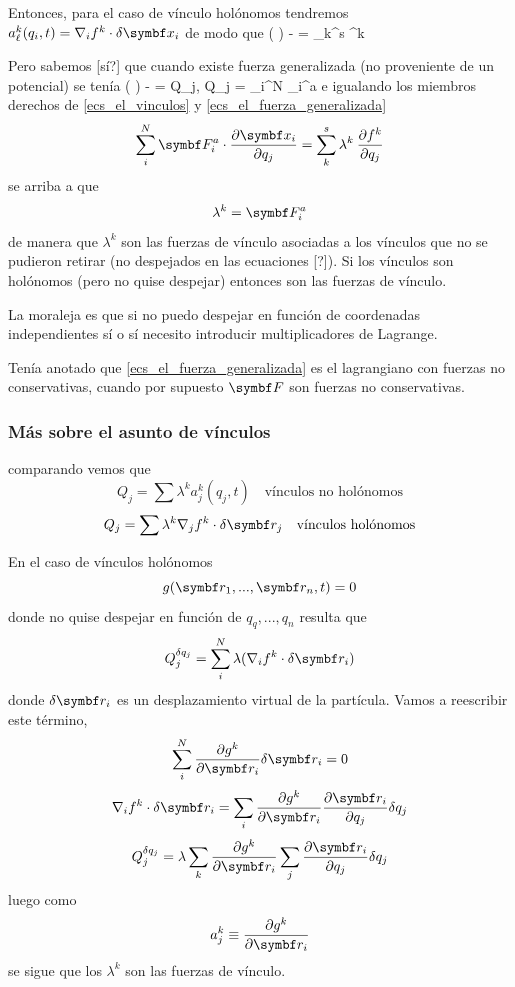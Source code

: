\documentclass[10pt,oneside]{CBFT_book}
\begin{document}
Entonces, para el caso de vínculo holónomos tendremos $ a^k_\ell(q_i,t) = \nabla_i f^k \cdot \delta \vb{x}_i $ de modo que
\be
	\left(  \right) - =
	\sum_{k}^s \lambda^k \: 
	\label{ecs_el_vinculos}
\ee
{}

Pero sabemos [sí?] que cuando existe fuerza generalizada (no proveniente de un potencial) se tenía 
\be
	\left(  \right) - = Q_j, \qquad \qquad 
	Q_j = \sum_i^N _i^a \cdot {}
	\label{ecs_el_fuerza_generalizada}
\ee
e igualando los miembros derechos de \eqref{ecs_el_vinculos} y \eqref{ecs_el_fuerza_generalizada} 
\[
	\sum_i^N \vb{F}_i^a \cdot \dpar{\vb{x}_i}{q_j} = \sum_{k}^s \lambda^k \: \dpar{f^k}{q_j}
\]
se arriba a que 
\[
	\lambda^k = \vb{F}_i^a 
\]
de manera que $\lambda^k$ son las fuerzas de vínculo asociadas a los vínculos que no se pudieron retirar
(no despejados en las ecuaciones [?]).
Si los vínculos son holónomos (pero no quise despejar) entonces son las fuerzas de vínculo.

La moraleja es que si no puedo despejar en función de coordenadas independientes sí o sí necesito introducir
multiplicadores de Lagrange.

Tenía anotado que \eqref{ecs_el_fuerza_generalizada} es el lagrangiano con fuerzas no conservativas, cuando por 
supuesto $\vb{F}$ son fuerzas no conservativas.


\subsubsection{Más sobre el asunto de vínculos}

comparando vemos que 
\[
	Q_j = \sum \lambda^k a^k_j(q_j,t) \quad \textrm{vínculos no holónomos}
\]
\[
	Q_j=  \sum \lambda^k \nabla_j f^k \cdot \delta \vb{r}_j  \quad \textrm{vínculos holónomos}
\]

En el caso de vínculos holónomos 
\[
	g(\vb{r}_1,...,\vb{r}_n,t) = 0 
\]
donde no quise despejar en función de $q_q,...,q_n$ resulta que 
\[
	Q_j^{\delta q_j} =  \sum_i^N \lambda (\nabla_i f^k\cdot\delta\vb{r}_i)
\]
donde $\delta\vb{r}_i$ es un desplazamiento virtual de la partícula.
Vamos a reescribir este término,
\[
	\sum_i^N \dpar{g^k}{\vb{r}_i} \delta \vb{r}_i = 0
\]
\[
	\nabla_i f^k\cdot\delta\vb{r}_i = \sum_i \dpar{g^k}{\vb{r}_i} \dpar{\vb{r}_i}{q_j} \delta q_j
\]
\[
	Q_j^{\delta q_j} =  \lambda \sum_k \dpar{g^k}{\vb{r}_i} \sum_j \dpar{\vb{r}_i}{q_j} \delta q_j
\]
luego como 
\[
	a^k_j \equiv \dpar{g^k}{\vb{r}_i}
\]
se sigue que los $\lambda^k$ son las fuerzas de vínculo.
\end{document}
